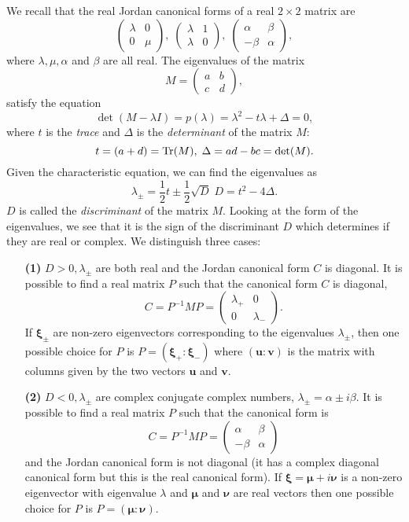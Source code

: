 \documentclass[12pt, a4paper]{article}
\newcommand{\f}[2]{\frac{#1}{#2}}
\theoremstyle{definition}
\theoremstyle{plain}
\begin{document}
We recall that the real Jordan canonical forms of a real $2\times 2$ matrix are $$\begin{pmatrix} \lambda &0 \\ 0&\mu \end{pmatrix}, \; \begin{pmatrix} \lambda &1 \\ \lambda&0 \end{pmatrix}, \; \begin{pmatrix} \alpha &\beta \\ -\beta&\alpha \end{pmatrix},$$ where $\lambda,\mu,\alpha$ and $\beta$ are all real. The eigenvalues of the matrix $$M=\begin{pmatrix} a&b\\c&d \end{pmatrix},$$ satisfy the equation $$\det(M -\lambda I)=p(\lambda)=\lambda^2-t\lambda+\Delta=0,$$ where $t$ is the \textit{trace} and $\Delta$ is the \textit{determinant} of the matrix $M:$ $$t=(a+d)=\Trace(M), \; \Delta=ad-bc=\det(M).$$ Given the characteristic equation, we can find the eigenvalues as $$\lambda_\pm=\f{1}{2}t\pm\f{1}{2}\sqrt{D}\; D=t^2-4\Delta.$$ $D$ is called the \textit{discriminant} of the matrix $M.$ Looking at the form of the eigenvalues, we see that it is the sign of the discriminant $D$ which determines if they are real or complex. We distinguish three cases: \begin{enumerate}
	
	\item[\textbf{(1)}] $D > 0, \lambda_\pm$ are both real and the Jordan canonical form $C$ is diagonal. It is possible to find a real matrix $P$ such that the canonical form $C$ is diagonal, $$C=P^{-1}MP=\begin{pmatrix} \lambda_{+} &0 \\ 0&\lambda_{-} \end{pmatrix}.$$ If $\bm{\xi}_\pm$ are non-zero eigenvectors corresponding to the eigenvalues $\lambda_\pm$, then one possible choice for $P$ is $P = (\bm{\xi}_{+}:\bm{\xi}_{-})$ where $(\bm{u} : \bm{v})$ is the matrix with columns given by the two vectors $\bm{u}$ and $\bm{v}.$

	\item[\textbf{(2)}]  $D < 0, \lambda_\pm$ are complex conjugate complex numbers, $\lambda_\pm = \alpha \pm i\beta.$ It is possible to find a real matrix $P$ such that the canonical form is $$C=P^{-1}MP=\begin{pmatrix} \alpha &\beta \\ -\beta&\alpha \end{pmatrix}$$ and the Jordan canonical form is not diagonal (it has a complex diagonal canonical form but this is the real canonical form). If $\bm{\xi} = \bm{\mu} + i\bm{\nu}$ is a non-zero eigenvector with eigenvalue $\lambda$ and $\bm{\mu}$ and $\bm{\nu}$ are real vectors then one possible choice for $P$ is $P= (\bm{\mu} : \bm{\nu}).$


\end{enumerate}
\end{document}
